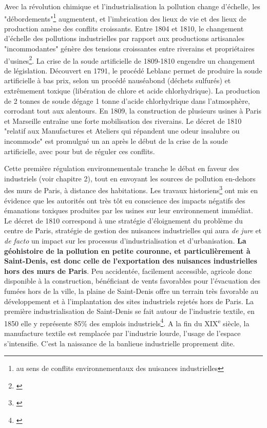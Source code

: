\documentclass[a4paper,twoside,12pt]{book}
\newcommand{\siecle}[1]{\textsc{#1}\textsuperscript{e} siècle}
\begin{document}
Avec la révolution chimique et l'industrialisation la pollution change d'échelle, les "débordements"\footnote{au sens de conflits environnementaux des nuisances industrielles}  augmentent, et l'imbrication des lieux de vie et des lieux de production amène des conflits croissants. Entre 1804 et 1810, le changement d'échelle des pollutions industrielles par rapport aux productions artisanales "incommodantes" génère des tensions croissantes entre riverains et propriétaires d'usines\footnote{\cite{lette_debordements_2013}}. La crise de la soude artificielle de 1809-1810 engendre un changement de législation. Découvert en 1791, le procédé Leblanc permet de produire la soude artificielle à bas prix, selon un procédé nauséabond (déchets sulfurés) et extrêmement toxique (libération de chlore et acide chlorhydrique). La production de 2 tonnes de soude dégage 1 tonne d'acide chlorhydrique dans l'atmosphère, corrodant tout aux alentours. En 1809, la construction de plusieurs usines à Paris et Marseille entraîne une forte mobilisation des riverains. Le décret de 1810 "relatif aux Manufactures et Ateliers qui répandent une odeur insalubre ou incommode" est promulgué un an après le début de la crise de la soude artificielle, avec pour but de réguler ces conflits. 

Cette première régulation environnementale tranche le débat en faveur des industriels (voir chapitre 2), tout en envoyant les sources de pollution en-dehors des murs de Paris, à distance des habitations. Les travaux historiens\footnote{\cite{massard-guilbaud_genevieve_histoire_2010}} ont mis en évidence que les autorités ont très tôt eu conscience des impacts négatifs des émanations toxiques produites par les usines sur leur environnement immédiat. Le décret de 1810 correspond à une stratégie d'éloignement du problème du centre de Paris, stratégie de gestion des nuisances industrielles qui aura \textit{de jure} et \textit{de facto} un impact sur les processus d'industrialisation et d'urbanisation. \textbf{La géohistoire de la pollution en petite couronne, et particulièrement à Saint-Denis, est donc celle de l'exportation des nuisances industrielles hors des murs de Paris}. Peu accidentée, facilement accessible, agricole donc disponible à la construction, bénéficiant de vents favorables pour l'évacuation des fumées hors de la ville, la plaine de Saint-Denis offre un terrain très favorable au développement et à l'implantation des sites industriels rejetés hors de Paris. La première industrialisation de Saint-Denis se fait autour de l'industrie textile, en 1850 elle y représente 85\% des emplois industriels\footnote{\cite{adda_usine_1979}}. A la fin du \siecle{XIX}, la manufacture textile est remplacée par l'industrie lourde, l'usage de l'espace s'intensifie. C'est la naissance de la banlieue industrielle proprement dite. 
\end{document}
